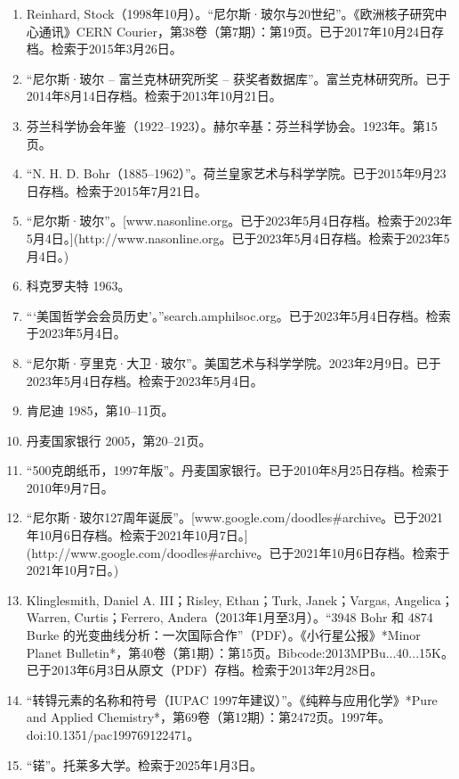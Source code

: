 \begin{enumerate}
\item Reinhard, Stock（1998年10月）。“尼尔斯·玻尔与20世纪”。《欧洲核子研究中心通讯》CERN Courier，第38卷（第7期）：第19页。已于2017年10月24日存档。检索于2015年3月26日。
\item “尼尔斯·玻尔 – 富兰克林研究所奖 – 获奖者数据库”。富兰克林研究所。已于2014年8月14日存档。检索于2013年10月21日。
\item 芬兰科学协会年鉴（1922–1923）。赫尔辛基：芬兰科学协会。1923年。第15页。
\item “N. H. D. Bohr（1885–1962）”。荷兰皇家艺术与科学学院。已于2015年9月23日存档。检索于2015年7月21日。
\item “尼尔斯·玻尔”。[www.nasonline.org。已于2023年5月4日存档。检索于2023年5月4日。](http://www.nasonline.org。已于2023年5月4日存档。检索于2023年5月4日。)
\item 科克罗夫特 1963。
\item “‘美国哲学会会员历史’。”search.amphilsoc.org。已于2023年5月4日存档。检索于2023年5月4日。
\item “尼尔斯·亨里克·大卫·玻尔”。美国艺术与科学学院。2023年2月9日。已于2023年5月4日存档。检索于2023年5月4日。
\item 肯尼迪 1985，第10–11页。
\item 丹麦国家银行 2005，第20–21页。
\item “500克朗纸币，1997年版”。丹麦国家银行。已于2010年8月25日存档。检索于2010年9月7日。
\item “尼尔斯·玻尔127周年诞辰”。[www.google.com/doodles#archive。已于2021年10月6日存档。检索于2021年10月7日。](http://www.google.com/doodles#archive。已于2021年10月6日存档。检索于2021年10月7日。)
\item Klinglesmith, Daniel A. III；Risley, Ethan；Turk, Janek；Vargas, Angelica；Warren, Curtis；Ferrero, Andera（2013年1月至3月）。“3948 Bohr 和 4874 Burke 的光变曲线分析：一次国际合作”（PDF）。《小行星公报》*Minor Planet Bulletin*，第40卷（第1期）：第15页。Bibcode:2013MPBu...40...15K。已于2013年6月3日从原文（PDF）存档。检索于2013年2月28日。
\item “转锝元素的名称和符号（IUPAC 1997年建议）”。《纯粹与应用化学》*Pure and Applied Chemistry*，第69卷（第12期）：第2472页。1997年。doi:10.1351/pac199769122471。
\item “锘”。托莱多大学。检索于2025年1月3日。
\end{enumerate}
